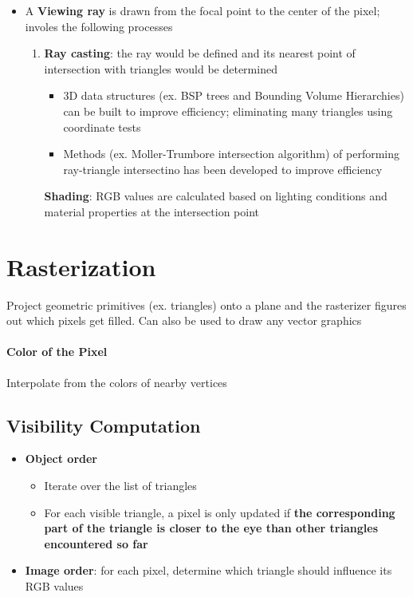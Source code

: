       \begin{itemize}
        \item A \textbf{Viewing ray} is drawn from the focal point to the center
        of the pixel; involes the following processes
        \begin{enumerate}
          \item \textbf{Ray casting}: the ray would be defined and its nearest
          point of intersection with triangles would be determined
          \begin{itemize}
            \item 3D data structures (ex. BSP trees and
            Bounding Volume Hierarchies) can be built to improve efficiency;
            eliminating many triangles using coordinate tests
            \item Methods (ex. Moller-Trumbore intersection algorithm) of performing ray-triangle intersectino has been
            developed to improve efficiency
          \end{itemize}
          \textbf{Shading}: RGB values are calculated based on lighting
          conditions and material properties at the intersection point
        \end{enumerate}
      \end{itemize}

\section{Rasterization}

  Project geometric primitives (ex. triangles) onto a plane and the rasterizer
  figures out which pixels get filled. Can also be used to draw any vector
  graphics

  \paragraph{Color of the Pixel}
  Interpolate from the colors of nearby vertices

  \subsection{Visibility Computation}

    \begin{itemize}
      \item \textbf{Object order}
      \begin{itemize}
        \item Iterate over the list of triangles
        \item For each visible triangle, a pixel is only updated if \textbf{
        the corresponding part of the triangle is closer to the eye than
        other triangles encountered so far}
      \end{itemize}
      \item \textbf{Image order}: for each pixel, determine which triangle should
      influence its RGB values
    \end{itemize}


